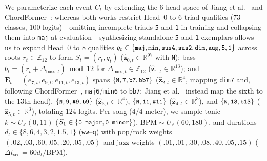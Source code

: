\documentclass{article}
\begin{document}
We parameterize each event $C_t$ by extending the 6-head space of Jiang et al.~\cite{jiang2019large} and ChordFormer~\cite{akram2026chordformer}: whereas both works restrict Head~0 to $6$ triad qualities ($73$ classes, $100$ logits)---omitting incomplete triads {\small\texttt{5}} and {\small\texttt{1}} in training and collapsing them into {\small\texttt{maj}} at evaluation---synthesizing standalone {\small\texttt{5}} and {\small\texttt{1}} exemplars allows us to expand Head~0 to $8$ qualities $q_t \in \{\text{\small\texttt{maj}}, \text{\small\texttt{min}}, \text{\small\texttt{sus4}}, \text{\small\texttt{sus2}}, \text{\small\texttt{dim}}, \text{\small\texttt{aug}}, \text{\small\texttt{5}}, \text{\small\texttt{1}}\}$ across roots $r_t \in \mathbb{Z}_{12}$ to form $S_t = (r_t, q_t)$ ($\hat{\mathbf{z}}_{0,t} \in \mathbb{R}^{97}$ with {\small\texttt{N}}); bass $b_t = (r_t + \Delta_{\text{bass},t}) \bmod 12$ for $\Delta_{\text{bass},t} \in \mathbb{Z}_{12}$ ($\hat{\mathbf{z}}_{1,t} \in \mathbb{R}^{13}$); and $\mathbf{E}_t = (e_{7,t}, e_{9,t}, e_{11,t}, e_{13,t})$ spans $\{\text{\small\texttt{N}}, \text{\small\texttt{7}}, \text{\small\texttt{b7}}, \text{\small\texttt{bb7}}\}$ ($\hat{\mathbf{z}}_{2,t} \in \mathbb{R}^4$, mapping {\small\texttt{dim7}} and, following ChordFormer~\cite{akram2026chordformer}, {\small\texttt{maj6}}/{\small\texttt{min6}} to {\small\texttt{bb7}}; Jiang et al.~\cite{jiang2019large} instead map the sixth to the 13th head), $\{\text{\small\texttt{N}}, \text{\small\texttt{9}}, \text{\small\texttt{\#9}}, \text{\small\texttt{b9}}\}$ ($\hat{\mathbf{z}}_{3,t} \in \mathbb{R}^4$), $\{\text{\small\texttt{N}}, \text{\small\texttt{11}}, \text{\small\texttt{\#11}}\}$ ($\hat{\mathbf{z}}_{4,t} \in \mathbb{R}^3$), and $\{\text{\small\texttt{N}}, \text{\small\texttt{13}}, \text{\small\texttt{b13}}\}$ ($\hat{\mathbf{z}}_{5,t} \in \mathbb{R}^3$), totaling $124$ logits. Per song ($4/4$ meter), we sample tonic $k \sim U_{\mathbb{Z}}(0, 11)$ ($S_1 \in \{\text{\small\texttt{0\_major}}, \text{\small\texttt{0\_minor}}\}$), $\text{BPM} \sim U_{\mathbb{Z}}(60, 180)$, and durations $d_t \in \{8, 6, 4, 3, 2, 1.5, 1\}$ ({\small\texttt{ww}}--{\small\texttt{q}}) with pop/rock weights $(.02, .03, .60, .05, .20, .05, .05)$ and jazz weights $(.01, .01, .30, .08, .40, .05, .15)$ ($\Delta t_{\text{sec}} = 60 d_t / \text{BPM}$).
\end{document}
